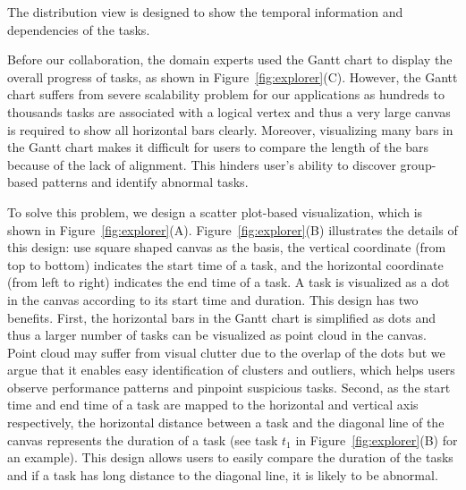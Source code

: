  

The distribution view is designed to show the temporal information and dependencies of the tasks.

Before our collaboration, the domain experts used the Gantt chart to display the overall progress of tasks, as shown in Figure~\ref{fig:explorer}(C). 
However, the Gantt chart suffers from severe scalability problem for our applications as hundreds to thousands tasks are associated with a logical vertex and thus a very large canvas is required to show all horizontal bars clearly. 
Moreover, visualizing many bars in the Gantt chart makes it difficult for users to compare the length of the bars because of the lack of alignment. This hinders user's ability to discover group-based patterns and identify abnormal tasks.

To solve this problem, we design a scatter plot-based visualization, which is shown in Figure~\ref{fig:explorer}(A). Figure~\ref{fig:explorer}(B) illustrates the details of this design: use square shaped canvas as the basis, the vertical coordinate (from top to bottom) indicates the start time of a task, and the horizontal coordinate (from left to right) indicates the end time of a task. A task is visualized as a dot in the canvas according to its start time and duration. This design has two benefits. First, the horizontal bars in the Gantt chart is simplified as dots and thus a larger number of tasks can be visualized as point cloud in the canvas. Point cloud may suffer from visual clutter due to the overlap of the dots but we argue that it enables easy identification of clusters and outliers, which helps users observe performance patterns and pinpoint suspicious tasks. Second, as the start time and end time of a task are mapped to the horizontal and vertical axis respectively, the horizontal distance between a task and the diagonal line of the canvas represents the duration of a task (see task $t_1$ in Figure~\ref{fig:explorer}(B) for an example). This design allows users to easily compare the duration of the tasks and if a task has long distance to the diagonal line, it is likely to be abnormal. 

